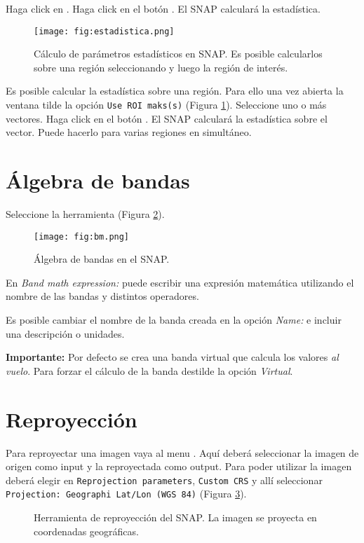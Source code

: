 Haga click en . Haga click en el botón . El SNAP calculará la estadística.

\begin{figure}[ht!]
    \centering
    \texttt{[image: fig:estadistica.png]}
    \caption{Cálculo de parámetros estadísticos en SNAP. Es posible calcularlos sobre una región seleccionando  y luego la región de interés.}
    \label{fig:estadistica}
\end{figure}


Es posible calcular la estadística sobre una región. Para ello una vez abierta la ventana tilde la opción \texttt{Use ROI maks(s)} (Figura \ref{fig:estadistica}). Seleccione uno o más vectores. Haga click en el botón . El SNAP calculará la estadística sobre el vector. Puede hacerlo para varias regiones en simultáneo.

\section{Álgebra de bandas}

 Seleccione la herramienta  (Figura \ref{fig:bm}).

 \begin{figure}[h!]
     \centering
     \texttt{[image: fig:bm.png]}
     \caption{Álgebra de bandas en el SNAP.}
     \label{fig:bm}
 \end{figure}

 En \emph{Band math expression:} puede escribir una expresión matemática utilizando el nombre de las bandas y distintos operadores.

 Es posible cambiar el nombre de la banda creada en la opción \emph{Name:} e incluir una descripción o unidades.

 {\bf Importante:} Por defecto se crea una banda virtual que calcula los valores \emph{al vuelo}. Para forzar el cálculo de la banda destilde la opción \emph{Virtual}.

 \section{Reproyección}

Para reproyectar una imagen vaya al menu . Aquí deberá seleccionar la imagen de origen como input y la reproyectada como output. Para poder utilizar la imagen deberá elegir en \texttt{Reprojection parameters}, \texttt{Custom CRS} y allí seleccionar \texttt{Projection: Geographi Lat/Lon (WGS 84)} (Figura \ref{fig:reproj}).

 \begin{figure}[h!]
     \centering
     \hspace{1cm}
     \caption{Herramienta de reproyección del SNAP. La imagen se proyecta en coordenadas geográficas.}
     \label{fig:reproj}
 \end{figure}
